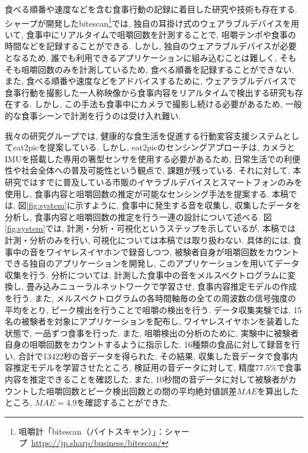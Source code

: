 食べる順番や速度などを含む食事行動の記録に着目した研究や技術も存在する. シャープが開発したbitescan\footnote{咀嚼計「bitescan（バイトスキャン）」：シャープ~\url{https://jp.sharp/business/bitescan/}}では, 独自の耳掛け式のウェアラブルデバイスを用いて, 食事中にリアルタイムで咀嚼回数を計測することで, 咀嚼テンポや食事の時間などを記録することができる. しかし, 独自のウェアラブルデバイスが必要となるため, 誰でも利用できるアプリケーションに組み込むことは難しく, そもそも咀嚼回数のみを計測しているため, 食べる順番を記録することができない. また, 食べる順番や速度などをアドバイスするために, ウェアラブルデバイスで食事行動を撮影した一人称映像から食事内容をリアルタイムで検出する研究も存在する\cite{10.1145/3551626.3564964}. しかし, この手法も食事中にカメラで撮影し続ける必要があるため, 一般的な食事シーンで計測を行うのは受け入れ難い.

我々の研究グループでは, 健康的な食生活を促進する行動変容支援システムとしてeat2picを提案している\cite{10.1145/3580784}. しかし, eat2picのセンシングアプローチは, カメラとIMUを搭載した専用の箸型センサを使用する必要があるため, 日常生活での利便性や社会全体への普及可能性という観点で, 課題が残っている. それに対して, 本研究ではすでに普及している市販のイヤラブルデバイスとスマートフォンのみを使用し, 食事内容と咀嚼回数の推定が可能なセンシング手法を提案する. 本稿では, 図\ref{fig:system}に示すように, 食事中に発生する音を収集し, 収集したデータを分析し, 食事内容と咀嚼回数の推定を行う一連の設計について述べる. 図\ref{fig:system}では, 計測・分析・可視化というステップを示しているが, 本稿では計測・分析のみを行い, 可視化については本稿では取り扱わない. 具体的には, 食事中の音をワイヤレスイヤホンで録音しつつ, 被験者自身が咀嚼回数をカウントできる独自のアプリケーションを開発し, このアプリケーションを用いてデータ収集を行う. 分析については, 計測した食事中の音をメルスペクトログラムに変換し, 畳み込みニューラルネットワークで学習させ, 食事内容推定モデルの作成を行う. また, メルスペクトログラムの各時間軸毎の全ての周波数の信号強度の平均をとり, ピーク検出を行うことで咀嚼の検出を行う. データ収集実験では, 15名の被験者を対象にアプリケーションを配布し, ワイヤレスイヤホンを装着した状態で, 一品ずつ食事を行った. また, 咀嚼検出の分析のために, 実験中に被験者自身の咀嚼回数をカウントするように指示した. 16種類の食品に対して録音を行い, 合計で13422秒の音データを得られた. その結果, 収集した音データで食事内容推定モデルを学習させたところ, 検証用の音データに対して, 精度$77.5\%$で食事内容を推定できることを確認した. また, 10秒間の音データに対して被験者がカウントした咀嚼回数とピーク検出回数との間の平均絶対値誤差$MAE$を算出したところ, $MAE = 4.9$を確認することができた.

